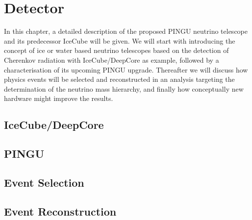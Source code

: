 \chapter{Detector}
\label{sec:det}

In this chapter, a detailed description of the proposed PINGU neutrino
telescope and its predecessor IceCube will be given. We will start with
introducing the concept of ice or water based neutrino telescopes based on the
detection of Cherenkov radiation with IceCube/DeepCore as example, followed by
a characterisation of its upcoming PINGU upgrade.
Thereafter we will discuss how physics events will be selected and
reconstructed in an analysis targeting the determination of the neutrino mass
hierarchy, and finally how conceptually new hardware might improve the results.

\section{IceCube/DeepCore}
\label{sec:ICDC}


\section{PINGU}
\label{sec:PINGU}


\section{Event Selection}
\label{sec:EvtSel}


\section{Event Reconstruction}
\label{sec:EvtReco}


